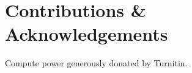 \documentclass[10pt,twocolumn,letterpaper]{article}
\begin{document}
\section{Contributions \& Acknowledgements}

Compute power generously donated by Turnitin.

{\small


}








\end{document}
